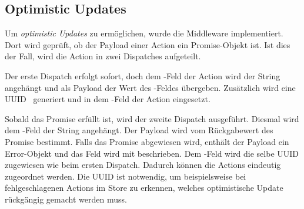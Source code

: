 \subsection{Optimistic Updates}
\label{ssec:fm_optimistic_updates}

Um \emph{optimistic Updates} zu ermöglichen, wurde die Middleware
 implementiert.  Dort wird geprüft, ob der Payload einer Action
ein Promise-Objekt ist.  Ist dies der Fall, wird die Action in zwei Dispatches
aufgeteilt.

Der erste Dispatch erfolgt sofort, doch dem -Feld der
Action wird der String  angehängt und als Payload der
Wert des -Feldes übergeben.  Zusätzlich wird eine UUID~\cite{RFC4122}
generiert und in dem -Feld der Action eingesetzt.

Sobald das Promise erfüllt ist, wird der zweite Dispatch ausgeführt.  Diesmal
wird dem -Feld der String  angehängt.  Der Payload
wird vom Rückgabewert des Promise bestimmt.  Falls das Promise abgewiesen wird,
enthält der Payload ein Error-Objekt und das Feld  wird mit
 beschrieben.  Dem -Feld wird die selbe UUID zugewiesen
wie beim ersten Dispatch.  Dadurch können die Actions eindeutig zugeordnet
werden.  Die UUID ist notwendig, um beispielsweise bei fehlgeschlagenen Actions
im Store zu erkennen, welches optimistische Update rückgängig gemacht werden
muss.

